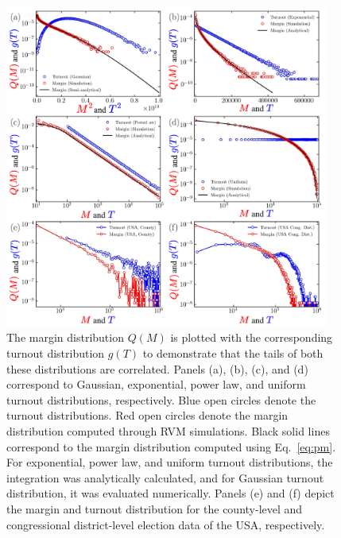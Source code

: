 \documentclass[reprint,aps,prl,showpacs,twocolumn, superscriptaddress]{revtex4-2}
\begin{document}
\begin{figure}[ht]
    \centering
    \includegraphics[width=0.95\textwidth]{fig_1_supp_rev_2.pdf}
    \caption{The margin distribution $Q(M)$ is plotted with the corresponding turnout distribution $g(T)$ to demonstrate that the tails of both these distributions are correlated. Panels (a), (b), (c), and (d) correspond to Gaussian, exponential, power law, and uniform turnout distributions, respectively. Blue open circles denote the turnout distributions. Red open circles denote the margin distribution computed through RVM simulations. Black solid lines correspond to the margin distribution computed using Eq.~\ref{eq:pm}. For exponential, power law, and uniform turnout distributions, the integration was analytically calculated, and for Gaussian turnout distribution, it was evaluated numerically. Panels (e) and (f) depict the margin and turnout distribution for the county-level and congressional district-level election data of the USA, respectively.}
    \label{fig_sup_1}
\end{figure}

\newpage
\end{document}
